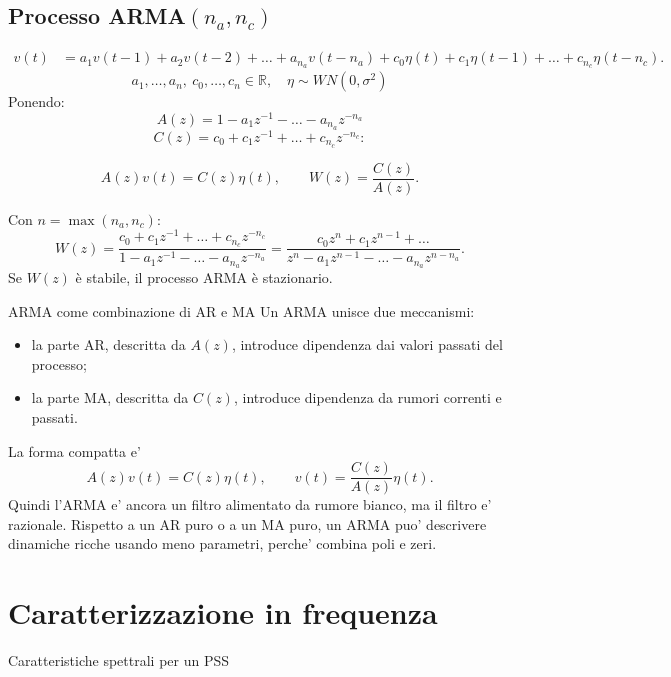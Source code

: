 \documentclass[11pt,a4paper]{article}
\begin{document}
\subsection{Processo ARMA\texorpdfstring{$(n_a,n_c)$}{(na,nc)}}
\begin{align*}
v(t)&=a_1 v(t-1)+a_2v(t-2)+\dots+a_{n_a}v(t-n_a)+c_0\eta(t)+c_1\eta(t-1)+\dots+c_{n_c}\eta(t-n_c).
\end{align*}
\[
a_1,\dots,a_n, \ c_0,\dots,c_n \in \mathbb{R}, \quad \eta \sim WN(0, \sigma^2)
\]
Ponendo: 
\[
A(z)=1-a_1 z^{-1}-\dots-a_{n_a}z^{-n_a}
\]
\[
C(z)=c_0+c_1 z^{-1}+\dots+c_{n_c}z^{-n_c}:
\]

\[
A(z)v(t)=C(z)\eta(t),\qquad W(z)=\frac{C(z)}{A(z)}.
\]
\begin{center}
\end{center}
Con $n=\max(n_a,n_c)$:
\[
W(z)= \frac{c_0+c_1 z^{-1}+\dots+c_{n_c}z^{-n_c}}{1-a_1 z^{-1}-\dots-a_{n_a}z^{-n_a}}=\frac{c_0 z^n+c_1 z^{n-1}+\dots}{z^n-a_1 z^{n-1}-\dots-a_{n_a}z^{n-n_a}}.
\]
Se $W(z)$ è stabile, il processo ARMA è stazionario.

\begin{spiegazione}{ARMA come combinazione di AR e MA}
Un ARMA unisce due meccanismi:
\begin{itemize}
  \item la parte AR, descritta da $A(z)$, introduce dipendenza dai valori passati del processo;
  \item la parte MA, descritta da $C(z)$, introduce dipendenza da rumori correnti e passati.
\end{itemize}
La forma compatta e'
\[
A(z)v(t)=C(z)\eta(t),
\qquad
v(t)=\frac{C(z)}{A(z)}\eta(t).
\]
Quindi l'ARMA e' ancora un filtro alimentato da rumore bianco, ma il filtro e' razionale. Rispetto a un AR puro o a un MA puro, un ARMA puo' descrivere dinamiche ricche usando meno parametri, perche' combina poli e zeri.
\end{spiegazione}

\section{Caratterizzazione in frequenza}
Caratteristiche spettrali per un PSS
\end{document}
